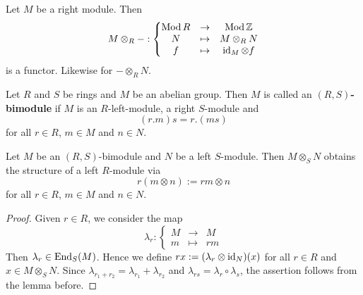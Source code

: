 
\begin{remark}
Let $M$ be a right module. Then 
\[
M \otimes_R - :
\left\{
\begin{matrix}
\operatorname{Mod} R &\to & \operatorname{Mod} \mathbb{Z} \\
N & \mapsto & M \otimes_R N \\
f & \mapsto & \operatorname{id}_M \otimes f
\end{matrix}
\right.
\]
is a functor. Likewise for $- \otimes_R N$.
\end{remark}


\begin{definition}
Let $R$ and $S$ be rings and $M$ be an abelian group. Then $M$ is called an \textbf{$(R,S)$-bimodule} if $M$ is an $R$-left-module, a right $S$-module and
\[
(r.m) s = r.(ms)
\]
for all $r\in R$, $m\in M$ and $n\in N$.
\end{definition}


\begin{theorem}
Let $M$ be an $(R,S)$-bimodule and $N$ be a left $S$-module. Then $M\otimes_S N$ obtains the structure of a left $R$-module via
\[
r(m\otimes n) := rm \otimes n
\]
for all $r\in R$, $m\in M$ and $n\in N$.
\end{theorem}


\begin{proof}
Given $r\in R$, we consider the map
\[
\lambda_r :
\left\{
\begin{matrix}
M & \to & M \\
m & \mapsto & rm
\end{matrix}
\right.
\]
Then $\lambda_r\in\operatorname{End}_S(M)$. Hence we define $rx := (\lambda_r \otimes \operatorname{id}_N)(x)$ for all $r\in R$ and $x\in M\otimes_S N$. Since $\lambda_{r_1+r_2}=\lambda_{r_1}+\lambda_{r_2}$ and $\lambda_{rs}=\lambda_{r}\circ\lambda_{s}$, the assertion follows from the lemma before.
\end{proof}


